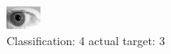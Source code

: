 \begin{figure}[h!]
\begin{center}
\includegraphics[width=0.60\columnwidth]{figures/ID221_class_4_target_3.png}
\end{center}
\caption{ Classification: 4 actual target: 3}
\label{fig:ID221_class_4_target_3}
\end{figure}

